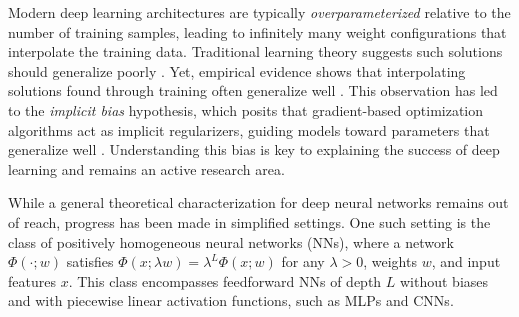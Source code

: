 Modern deep learning architectures are typically \emph{overparameterized} relative to the number of training samples, leading to infinitely many weight configurations that interpolate the training data. Traditional learning theory suggests such solutions should generalize poorly \citep{vapnik, belkin2019reconciling}. Yet, empirical evidence shows that interpolating solutions found through training often generalize well \citep{zhang2021understanding}.
This observation has led to the \emph{implicit bias} hypothesis, which posits that gradient-based optimization algorithms act as implicit regularizers, guiding models toward parameters that generalize well \citep{NeyshaburTS14,GunasekarLSS18}. Understanding this bias is key to explaining the success of deep learning and remains an active research area.

While a general theoretical characterization for deep neural networks remains out of reach, progress has been made in simplified settings. One such setting is the class of positively homogeneous neural networks (NNs), where a network $\Phi(\cdot; w)$ satisfies $\Phi(x; \lambda w) = \lambda^L \Phi(x; w)$ for any $\lambda > 0$, weights $w$, and input features $x$. This class encompasses feedforward NNs of depth $L$ without biases and with piecewise linear activation functions, such as MLPs and CNNs.


